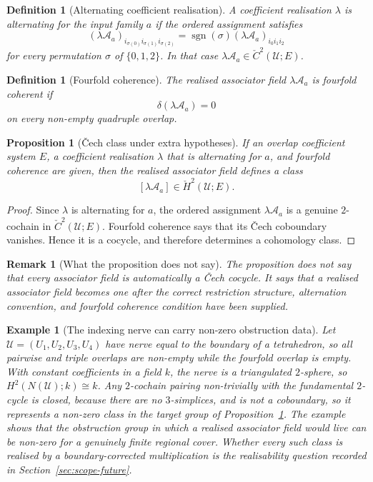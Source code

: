 \documentclass[11pt]{article}
\newtheorem{proposition}[theorem]{Proposition}
\newtheorem{definition}[theorem]{Definition}
\newtheorem{remark}[theorem]{Remark}
\newtheorem{example}[theorem]{Example}
\newcommand{\Cech}{\check{C}}
\newcommand{\CechH}{\check{H}}
\begin{document}
\begin{definition}[Alternating coefficient realisation]
A coefficient realisation \(\lambda\) is alternating for the input family \(a\) if the ordered assignment satisfies
\[
(\lambda\mathcal A_a)_{i_{\sigma(0)}i_{\sigma(1)}i_{\sigma(2)}}
=
\operatorname{sgn}(\sigma)(\lambda\mathcal A_a)_{i_0i_1i_2}
\]
for every permutation \(\sigma\) of \(\{0,1,2\}\). In that case \(\lambda\mathcal A_a\in \Cech^2(\mathcal U;E)\).
\end{definition}

\begin{definition}[Fourfold coherence]
The realised associator field \(\lambda\mathcal A_a\) is fourfold coherent if
\[
\delta(\lambda\mathcal A_a)=0
\]
on every non-empty quadruple overlap.
\end{definition}

\begin{proposition}[\v{C}ech class under extra hypotheses]
\label{prop:cech-class}
If an overlap coefficient system \(E\), a coefficient realisation \(\lambda\) that is alternating for \(a\), and fourfold coherence are given, then the realised associator field defines a class
\[
[\lambda\mathcal A_a]\in \CechH^2(\mathcal U;E).
\]
\end{proposition}

\begin{proof}
Since \(\lambda\) is alternating for \(a\), the ordered assignment \(\lambda\mathcal A_a\) is a genuine \(2\)-cochain in \(\Cech^2(\mathcal U;E)\). Fourfold coherence says that its \v{C}ech coboundary vanishes. Hence it is a cocycle, and therefore determines a cohomology class.
\end{proof}

\begin{remark}[What the proposition does not say]
The proposition does not say that every associator field is automatically a \v{C}ech cocycle. It says that a realised associator field becomes one after the correct restriction structure, alternation convention, and fourfold coherence condition have been supplied.
\end{remark}

\begin{example}[The indexing nerve can carry non-zero obstruction data]
\label{ex:tetrahedron}
Let \(\mathcal U=(U_1,U_2,U_3,U_4)\) have nerve equal to the boundary of a tetrahedron, so all pairwise and triple overlaps are non-empty while the fourfold overlap is empty. With constant coefficients in a field \(k\), the nerve is a triangulated \(2\)-sphere, so \(H^2(N(\mathcal U);k)\cong k\). Any \(2\)-cochain pairing non-trivially with the fundamental \(2\)-cycle is closed, because there are no \(3\)-simplices, and is not a coboundary, so it represents a non-zero class in the target group of Proposition~\ref{prop:cech-class}. The example shows that the obstruction group in which a realised associator field would live can be non-zero for a genuinely finite regional cover. Whether every such class is realised by a boundary-corrected multiplication is the realisability question recorded in Section~\ref{sec:scope-future}.
\end{example}
\end{document}
